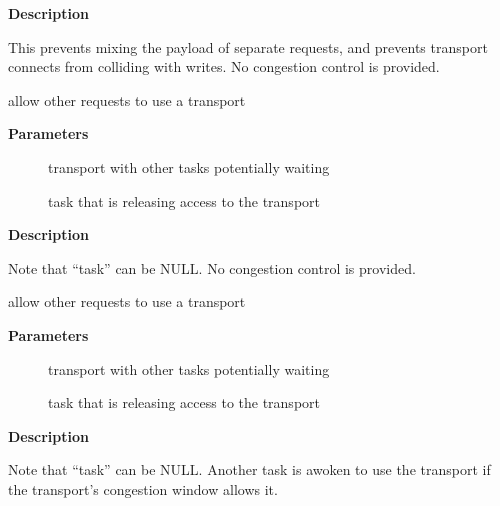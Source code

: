 \documentclass[a4paper,8pt,english]{sphinxmanual}
\begin{document}
\textbf{Description}

This prevents mixing the payload of separate requests, and prevents
transport connects from colliding with writes.  No congestion control
is provided.

\begin{fulllineitems}
\label{networking/kapi:c.xprt_release_xprt}
allow other requests to use a transport

\end{fulllineitems}


\textbf{Parameters}
\begin{description}
\item[{}] \leavevmode
transport with other tasks potentially waiting

\item[{}] \leavevmode
task that is releasing access to the transport

\end{description}

\textbf{Description}

Note that ``task'' can be NULL.  No congestion control is provided.

\begin{fulllineitems}
\label{networking/kapi:c.xprt_release_xprt_cong}
allow other requests to use a transport

\end{fulllineitems}


\textbf{Parameters}
\begin{description}
\item[{}] \leavevmode
transport with other tasks potentially waiting

\item[{}] \leavevmode
task that is releasing access to the transport

\end{description}

\textbf{Description}

Note that ``task'' can be NULL.  Another task is awoken to use the
transport if the transport's congestion window allows it.
\end{document}

